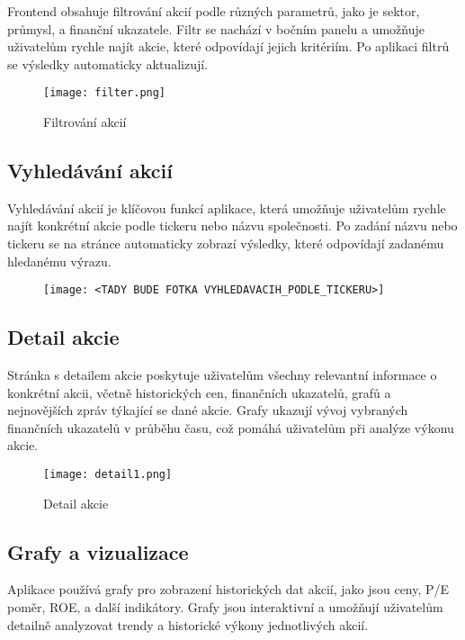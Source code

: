 \documentclass[12pt, a4paper]{report}
\begin{document}
Frontend obsahuje filtrování akcií podle různých parametrů, jako je sektor, průmysl, a finanční ukazatele. Filtr se nachází v bočním panelu a umožňuje uživatelům rychle najít akcie, které odpovídají jejich kritériím. Po aplikaci filtrů se výsledky automaticky aktualizují.

\begin{figure}[h]
	\centering
	\texttt{[image: filter.png]}
    \caption{Filtrování akcií}
\end{figure}

\subsection{Vyhledávání akcií}

Vyhledávání akcií je klíčovou funkcí aplikace, která umožňuje uživatelům rychle najít konkrétní akcie podle tickeru nebo názvu společnosti. Po zadání názvu nebo tickeru se na stránce automaticky zobrazí výsledky, které odpovídají zadanému hledanému výrazu.

\begin{figure}[h]
	\centering
	\texttt{[image: <TADY BUDE FOTKA VYHLEDAVACIH\_PODLE\_TICKERU>]}
\end{figure}

\subsection{Detail akcie}

Stránka s detailem akcie poskytuje uživatelům všechny relevantní informace o konkrétní akcii, včetně historických cen, finančních ukazatelů, grafů a nejnovějších zpráv týkající se dané akcie. Grafy ukazují vývoj vybraných finančních ukazatelů v průběhu času, což pomáhá uživatelům při analýze výkonu akcie.

\begin{figure}[h]
	\centering
	\texttt{[image: detail1.png]}
    \caption{Detail akcie}
\end{figure}

\subsection{Grafy a vizualizace}

Aplikace používá grafy pro zobrazení historických dat akcií, jako jsou ceny, P/E poměr, ROE, a další indikátory. Grafy jsou interaktivní a umožňují uživatelům detailně analyzovat trendy a historické výkony jednotlivých akcií.
\end{document}
